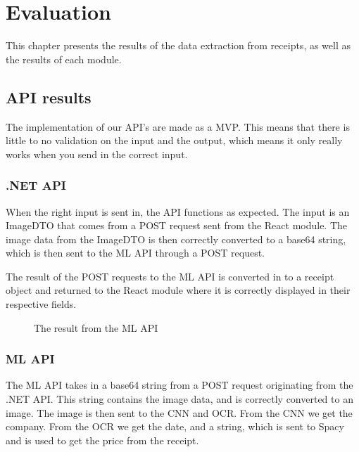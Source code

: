 \chapter{Evaluation}
\label{ch:evaluation}
This chapter presents the results of the data extraction from receipts, as well as the results of each module.

\section{API results}\label{sec:api-results}
The implementation of our API's are made as a MVP\@.
This means that there is little to no validation on the input and the output, which means it only really works when
you send in the correct input.

\subsection{.NET API}\label{subsec:.net-api}

When the right input is sent in, the API functions as expected.
The input is an ImageDTO that comes from a POST request sent from the React module.
The image data from the ImageDTO is then correctly converted to a base64 string, which is then sent to the ML API through a POST request.

The result of the POST requests to the ML API is converted in to a receipt object and returned to the React module
where it is correctly displayed in their respective fields.

\begin{figure}[h]
    \caption{The result from the ML API}
    \label{fig:MLAPIreturnObject}
\end{figure}

\subsection{ML API}\label{subsec:ml-api}
The ML API takes in a base64 string from a POST request originating from the .NET API\@.
This string contains the image data, and is correctly converted to an image.
The image is then sent to the CNN and OCR\@.
From the CNN we get the company.
From the OCR we get the date, and a string, which is sent to Spacy and is used to get the price from the receipt.

